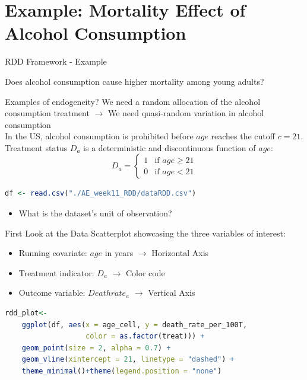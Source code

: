 \documentclass[11pt, aspectratio = 169]{beamer}
\begin{document}
\section{Example: Mortality Effect of Alcohol Consumption}

\begin{frame}[fragile]{RDD Framework - Example}
	\begin{center}
		Does alcohol consumption \alert{cause} higher mortality among young adults?
	\end{center} \pause
	Examples of endogeneity? \pause We need a random allocation of the alcohol consumption treatment
	$\rightarrow$ 	We need quasi-random variation in alcohol consumption
		\pause
		\bigskip
		\\
		In the US, alcohol consumption is prohibited before $age$ reaches the cutoff \textbf{$c=21$}.
		\medskip
		\\
		Treatment status $D_a$ is a \alert{deterministic} and \alert{discontinuous} function of $age$:
		\[
		D_a =
		\begin{cases}
		1 & \text{if } age \ge 21 \\
		0 & \text{if } age < 21
		\end{cases}
		\]
	\vspace{0.2cm}
	\pause
	\begin{lstlisting}[language=R]
	df <- read.csv("./AE_week11_RDD/dataRDD.csv")
		\end{lstlisting}
	\vspace{-0.2cm}
	\begin{itemize}
		\item[$\rightarrow$] What is the dataset's unit of observation?
	\end{itemize}
	\end{frame}

	\begin{frame}[fragile]{First Look at the Data}
	Scatterplot showcasing the three variables of interest:
	\begin{itemize}
		\item Running covariate: $age$ in years $\rightarrow$ Horizontal Axis
		\item Treatment indicator: $D_a$ $\rightarrow$ Color code
		\item Outcome variable: $Deathrate_a$ $\rightarrow$ Vertical Axis
	\end{itemize}
	\vspace{0.5cm}
	\pause
	\begin{lstlisting}[language=R]
	rdd_plot<-
	ggplot(df, aes(x = age_cell, y = death_rate_per_100T,
 			       color = as.factor(treat))) +
	geom_point(size = 2, alpha = 0.7) +
	geom_vline(xintercept = 21, linetype = "dashed") +
	theme_minimal()+theme(legend.position = "none")
		\end{lstlisting}
	\end{frame}
	
\end{document}
